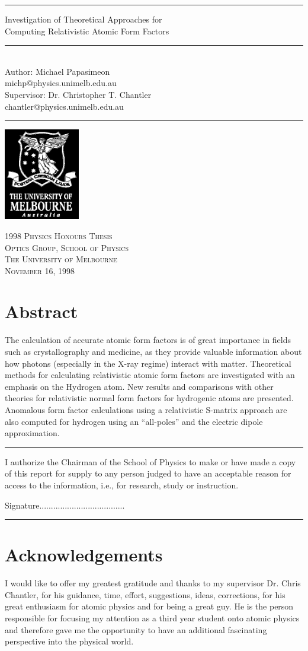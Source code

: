 \documentclass[a4paper,titlepage]{sfreport}
\newcommand{\HRule}{\rule{\textwidth}{1mm}}
\newcommand{\Trule}{\rule{\textwidth}{0.1pt}}
\newcommand{\maketitlepage}[2]{
    \begin{titlepage}
    \vspace*{\stretch{1}}
    \HRule
\begin{center}
        {\textsf{{ \huge  #1} }}
        \\[5mm]
        \Trule
        \\[5mm]
        \Large \textsf{#2}
\end{center}
    \HRule
    \vspace*{\stretch{2}}
    \begin{center}
        \includegraphics[height=4cm]{UMCrest97.eps}
    \end{center}
    \begin{center}
        \Large\textsc{1998 Physics Honours Thesis \\
                      Optics Group, School of Physics\\
                      The University of Melbourne \\
                      November 16, 1998}
    \end{center}
    \end{titlepage}
}
\begin{document}
    \maketitlepage{Investigation of Theoretical Approaches for\\
                   \vspace{3mm} 
                   Computing Relativistic Atomic Form Factors}%
                   {Author: Michael Papasimeon \\ michp@physics.unimelb.edu.au 
                   \\[5mm]
                   Supervisor: Dr. Christopher T. Chantler\\
                   chantler@physics.unimelb.edu.au}

    \chapter*{Abstract}
    The calculation of accurate atomic form factors is of great importance in
    fields such as crystallography and medicine, as they provide valuable 
    information about how photons (especially in the X-ray regime)
    interact with matter.
    Theoretical methods for calculating relativistic atomic form factors 
    are investigated with an emphasis on the Hydrogen atom.
    New results and comparisons with other theories for relativistic normal form 
    factors for hydrogenic atoms are presented.
    Anomalous form factor calculations using a relativistic S-matrix approach
    are also computed for hydrogen using an ``all-poles'' and the electric
    dipole approximation.
    \vspace*{10cm}
    \hrule
    \vspace*{5mm}
    I authorize the Chairman of the School of Physics to make or have made a
    copy of this report for supply to any person judged to have an
    acceptable reason for access to the information, i.e., for research,
    study or instruction.
    \vspace*{10mm}
    \begin{flushright}
    Signature.....................................
    \end{flushright}
    \vspace*{5mm}
    \hrule

    \chapter*{Acknowledgements}
    I would like to offer my greatest gratitude and thanks to my supervisor 
    Dr. Chris Chantler, for his guidance, time, effort, suggestions, ideas, corrections,
    for his great enthusiasm for atomic physics and for being a great guy.
    He is the person responsible for focusing my attention as a third year
    student onto atomic physics and therefore gave me the opportunity
    to have an additional fascinating perspective into the physical world.
\end{document}
